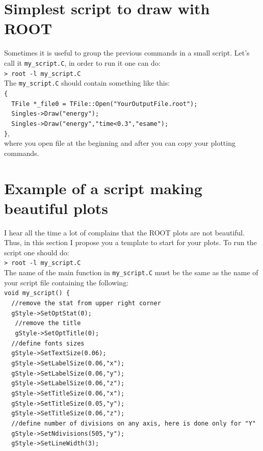 \documentclass[12pt]{article}
\begin{document}
\clearpage
\section{Simplest script to draw with ROOT}
Sometimes it is useful to group the previous commands in a small script. Let's call it \verb|my_script.C|, in order to run it one can do: \\
 \verb|> root -l my_script.C |\\
 
The \verb|my_script.C| should contain something like this: \\
 \verb|{|\\
 \verb|  TFile *_file0 = TFile::Open("YourOutputFile.root");|\\
 \verb|  Singles->Draw("energy");|\\
 \verb|  Singles->Draw("energy","time<0.3","esame");|\\
 \verb|}|,\\
where you open file at the beginning and after you can copy your plotting commands.

\section{Example of a script making beautiful plots}
I hear all the time a lot of complains that the ROOT plots are not beautiful.  Thus, in this section I propose you a template to start for your plots. To run the script one should do:\\
 \verb|> root -l my_script.C |\\

The name of the main function in \verb|my_script.C| must be the same as the name of your script file containing the following: \\
 \verb|void my_script() {| \\ 
 \verb|  //remove the stat from upper right corner|\\
 \verb|  gStyle->SetOptStat(0);|\\
 \verb|   //remove the title|\\
 \verb|   gStyle->SetOptTitle(0);|\\
 \verb|  //define fonts sizes|\\
 \verb|  gStyle->SetTextSize(0.06);|\\
 \verb|  gStyle->SetLabelSize(0.06,"x");|\\
 \verb|  gStyle->SetLabelSize(0.06,"y");|\\
 \verb|  gStyle->SetLabelSize(0.06,"z");|\\
 \verb|  gStyle->SetTitleSize(0.06,"x");|\\
 \verb|  gStyle->SetTitleSize(0.05,"y");|\\
 \verb|  gStyle->SetTitleSize(0.06,"z");|\\
 \verb|  //define number of divisions on any axis, here is done only for "Y"|\\
\verb|  gStyle->SetNdivisions(505,"y");|\\
\verb|  gStyle->SetLineWidth(3);|\\
\end{document}
